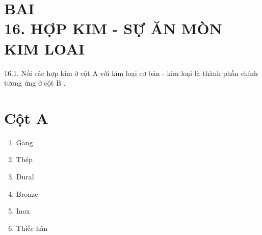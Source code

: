 \documentclass[10pt]{article}
\begin{document}
\section*{BAI \\
 16. HỢP KIM - SỰ̆ ĂN MÒN KIM LOAI}
16.1. Nối các hợp kim ở cột A với kỉm loại cơ bản - kim loại là thành phần chính tương ứng ở cột B .

\section*{Cột $\mathbf{A}$}
\begin{enumerate}
  \item Gang
  \item Thép
  \item Dural
  \item Bronze
  \item Inox
  \item Thiếc hàn
\end{enumerate}
\end{document}
